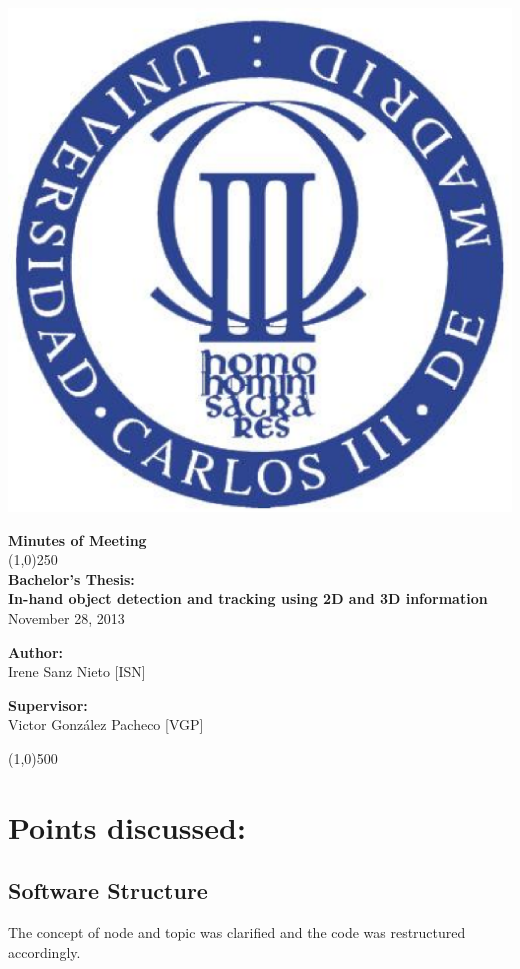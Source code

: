 \documentclass{article}
\newenvironment{myindentpar}[1]%
 {\begin{list}{}%
         {\setlength{\leftmargin}{#1}}%
         \item[]%
 }
 {\end{list}}
\begin{document}
\includegraphics[width=0.1\linewidth]{../template/uc3m.eps}

\vspace{-1cm}
\begin{minipage}[b]{1\linewidth}
	\begin{center}
	{\Huge \bfseries{Minutes of Meeting}}\\
	\line(1,0){250}\\[0.5cm]
	{\LARGE \textbf{Bachelor's Thesis:\\[0.5cm] In-hand object detection and tracking using 2D and 3D information}}\\[0.5cm]
	{\large November 28, 2013 }
	\end{center}
\end {minipage}



\begin{minipage}{0.55\textwidth}
\begin{flushleft} \large
\textbf{{Author:}\\}
Irene Sanz Nieto [ISN]\\
\end{flushleft}
\end{minipage}
\begin{minipage}{0.4\textwidth}
\begin{flushright} \large
\textbf{Supervisor: }\\
Victor González Pacheco [VGP]
\end{flushright}\end{minipage}

\begin{center}
\line(1,0){500}
\end{center}

\renewcommand{\thesubsection}
{\hspace*{1cm} \arabic{section}.\arabic{subsection}}



\section{\LARGE Points discussed: }

	\subsection{Software Structure}
	\begin{myindentpar}{1cm} 
		The concept of node and topic was clarified and the code was restructured accordingly. 
	\end{myindentpar}
\end{document}

